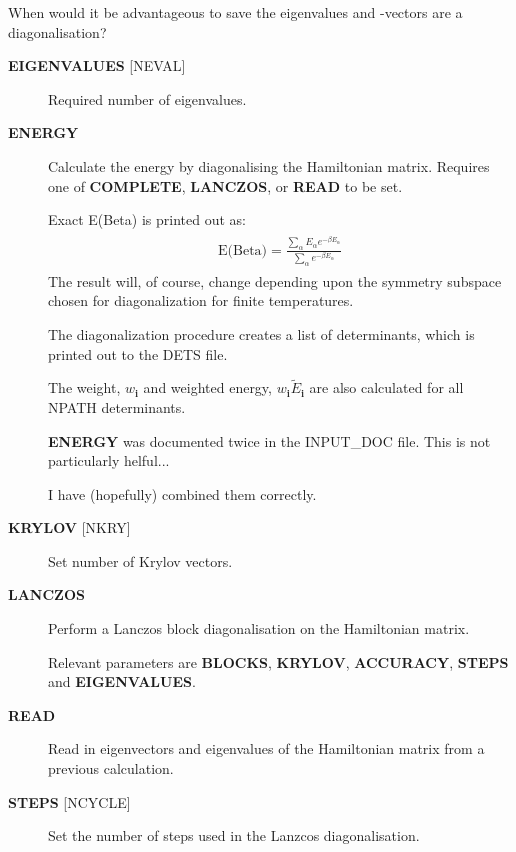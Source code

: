 \documentclass[openany,a4paper,10pt]{manual}
\newcommand{\veci}{\ensuremath{\mathbf{i}}}
\begin{document}
\begin{notice}[note]
When would it be advantageous to save the eigenvalues and -vectors
are a diagonalisation?
\end{notice}
\begin{description}
\item[\textbf{EIGENVALUES} {[}NEVAL{]}]
Required number of eigenvalues.

\item[\textbf{ENERGY}]
Calculate the energy by diagonalising the Hamiltonian matrix.
Requires one of \textbf{COMPLETE}, \textbf{LANCZOS}, or \textbf{READ} to be set.

Exact E(Beta) is printed out as:
\begin{align}\begin{split}\text{E(Beta)} = \frac{ \sum_{\alpha} E_{\alpha} e^{-\beta E_{\alpha}} } { \sum_{\alpha} e^{-\beta E_{\alpha}} }\end{split}\end{align}
The result will, of course, change depending upon the symmetry subspace
chosen for diagonalization for finite temperatures.

The diagonalization procedure creates a list of determinants, which
is printed out to the DETS file.

The weight, $w_{\veci}$ and weighted energy, $w_{\veci}
\tilde{E}_{\veci}$ are also calculated for all NPATH determinants.

\begin{notice}[note]
\textbf{ENERGY} was documented twice in the INPUT\_DOC file.  This is not
particularly helful...

I have (hopefully) combined them correctly.
\end{notice}

\item[\textbf{KRYLOV} {[}NKRY{]}]
Set number of Krylov vectors.

\item[\textbf{LANCZOS}]
Perform a Lanczos block diagonalisation on the Hamiltonian matrix.

Relevant parameters are \textbf{BLOCKS}, \textbf{KRYLOV}, \textbf{ACCURACY},
\textbf{STEPS} and \textbf{EIGENVALUES}.

\item[\textbf{READ}]
Read in eigenvectors and eigenvalues of the Hamiltonian matrix from a previous calculation.

\item[\textbf{STEPS} {[}NCYCLE{]}]
Set the number of steps used in the Lanzcos diagonalisation.

\end{description}
\end{document}
